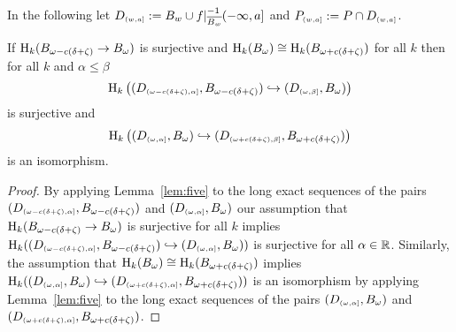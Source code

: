 

In the following let $D_{\scriptscriptstyle (w,a]} := B_w\cup f\mathord{\mid}_{\overline{B_w}}^{-1}(-\infty,a]$ and $P_{\scriptscriptstyle (w,a]} := P\cap D_{\scriptscriptstyle (w,a]}$.


\begin{lemma}\label{lem:pt_interleaving}
  If $\mathrm{H}_k(B_{\omega - c(\delta+\zeta)}\to B_{\omega})$ is surjective and $\mathrm{H}_k(B_{\omega})\cong \mathrm{H}_k(B_{\omega + c(\delta+\zeta)})$ for all $k$ then for all $k$ and $\alpha\leq\beta$
  \[\mathrm{H}_k\left((D_{\scriptscriptstyle (\omega-c(\delta+\zeta),\alpha]},B_{\omega-c(\delta+\zeta)})\hookrightarrow (D_{\scriptscriptstyle (\omega,\beta]},B_{\omega})\right)\]
  is surjective and
  \[ \mathrm{H}_k\left( (D_{\scriptscriptstyle (\omega,\alpha]},B_\omega)\hookrightarrow (D_{\scriptscriptstyle (\omega+c(\delta+\zeta),\beta]},B_{\omega+c(\delta+\zeta)}) \right)\]
  is an isomorphism.
\end{lemma}
\begin{proof}


  By applying Lemma~\ref{lem:five} to the long exact sequences of the pairs $(D_{\scriptscriptstyle (\omega-c(\delta+\zeta),\alpha]},B_{\omega - c(\delta+\zeta)})$ and $(D_{\scriptscriptstyle (\omega,\alpha]},B_{\omega})$ our assumption that $\mathrm{H}_k(B_{\omega - c(\delta+\zeta)}\to B_{\omega})$ is surjective for all $k$ implies $\mathrm{H}_k((D_{\scriptscriptstyle (\omega-c(\delta+\zeta),\alpha]},B_{\omega - c(\delta+\zeta)})\hookrightarrow (D_{\scriptscriptstyle (\omega,\alpha]},B_{\omega}))$ is surjective for all $\alpha\in\mathbb{R}$.
  Similarly, the assumption that $\mathrm{H}_k(B_{\omega})\cong \mathrm{H}_k(B_{\omega + c(\delta+\zeta)})$ implies $\mathrm{H}_k((D_{\scriptscriptstyle (\omega,\alpha]},B_{\omega})\hookrightarrow (D_{\scriptscriptstyle (\omega+c(\delta+\zeta),\alpha]},B_{\omega + c(\delta+\zeta)}))$ is an isomorphism by applying Lemma~\ref{lem:five} to the long exact sequences of the pairs $(D_{\scriptscriptstyle (\omega,\alpha]},B_{\omega})$ and $(D_{\scriptscriptstyle (\omega+c(\delta+\zeta),\alpha]},B_{\omega + c(\delta+\zeta)})$.


\end{proof}

